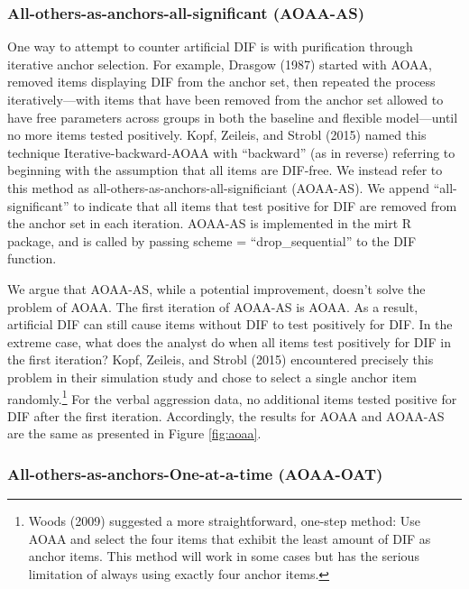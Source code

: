 \documentclass[
  english,
  man,floatsintext]{apa6}
\begin{document}
\hypertarget{all-others-as-anchors-all-significant-aoaa-as}{%
\subsubsection{All-others-as-anchors-all-significant (AOAA-AS)}\label{all-others-as-anchors-all-significant-aoaa-as}}

One way to attempt to counter artificial DIF is with purification through iterative anchor selection. For example, Drasgow (1987) started with AOAA, removed items displaying DIF from the anchor set, then repeated the process iteratively---with items that have been removed from the anchor set allowed to have free parameters across groups in both the baseline and flexible model---until no more items tested positively. Kopf, Zeileis, and Strobl (2015) named this technique Iterative-backward-AOAA with ``backward'' (as in reverse) referring to beginning with the assumption that all items are DIF-free. We instead refer to this method as all-others-as-anchors-all-significiant (AOAA-AS). We append ``all-significant'' to indicate that all items that test positive for DIF are removed from the anchor set in each iteration. AOAA-AS is implemented in the mirt R package, and is called by passing scheme = ``drop\_sequential'' to the DIF function.

We argue that AOAA-AS, while a potential improvement, doesn't solve the problem of AOAA. The first iteration of AOAA-AS is AOAA. As a result, artificial DIF can still cause items without DIF to test positively for DIF. In the extreme case, what does the analyst do when all items test positively for DIF in the first iteration? Kopf, Zeileis, and Strobl (2015) encountered precisely this problem in their simulation study and chose to select a single anchor item randomly.\footnote{Woods (2009) suggested a more straightforward, one-step method: Use AOAA and select the four items that exhibit the least amount of DIF as anchor items. This method will work in some cases but has the serious limitation of always using exactly four anchor items.} For the verbal aggression data, no additional items tested positive for DIF after the first iteration. Accordingly, the results for AOAA and AOAA-AS are the same as presented in Figure \ref{fig:aoaa}.

\hypertarget{all-others-as-anchors-one-at-a-time-aoaa-oat}{%
\subsubsection{All-others-as-anchors-One-at-a-time (AOAA-OAT)}\label{all-others-as-anchors-one-at-a-time-aoaa-oat}}
\end{document}
